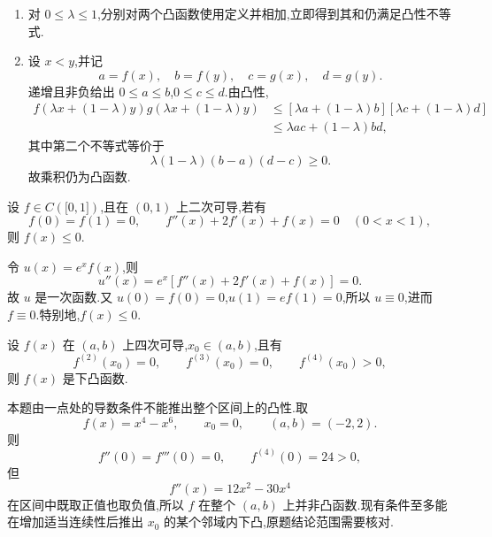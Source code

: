 \begin{solution}
    \leavevmode
    \begin{enumerate}
        \item 对 $0\leq\lambda\leq1$,分别对两个凸函数使用定义并相加,立即得到其和仍满足凸性不等式.

        \item 设 $x<y$,并记
              \[
                  a=f(x),\quad b=f(y),\quad c=g(x),\quad d=g(y).
              \]
              递增且非负给出 $0\leq a\leq b$,$0\leq c\leq d$.由凸性,
              \[
                  \begin{aligned}
                      f(\lambda x+(1-\lambda)y)
                      g(\lambda x+(1-\lambda)y)
                       & \leq[\lambda a+(1-\lambda)b]
                      [\lambda c+(1-\lambda)d]         \\
                       & \leq\lambda ac+(1-\lambda)bd,
                  \end{aligned}
              \]
              其中第二个不等式等价于
              \[
                  \lambda(1-\lambda)(b-a)(d-c)\geq0.
              \]
              故乘积仍为凸函数.
    \end{enumerate}
\end{solution}

\begin{example}
    设 $f\in C(\lbrack 0,1\rbrack)$,且在 $(0,1)$ 上二次可导,若有
    \[
        f(0)=f(1)=0,
        \qquad f''(x)+2f'(x)+f(x)=0\quad(0<x<1),
    \]
    则 $f(x)\leq0$.
\end{example}
\exampleblank

\begin{solution}
    令 $u(x)=e^x f(x)$,则
    \[
        u''(x)=e^x[f''(x)+2f'(x)+f(x)]=0.
    \]
    故 $u$ 是一次函数.又 $u(0)=f(0)=0$,$u(1)=ef(1)=0$,所以 $u\equiv0$,进而 $f\equiv0$.特别地,$f(x)\leq0$.
\end{solution}

\begin{example}
    设 $f(x)$ 在 $(a,b)$ 上四次可导,$x_0\in(a,b)$,且有
    \[
        f^{(2)}(x_0)=0,
        \qquad f^{(3)}(x_0)=0,
        \qquad f^{(4)}(x_0)>0,
    \]
    则 $f(x)$ 是下凸函数.
\end{example}
\exampleblank

\begin{solution}
    本题由一点处的导数条件不能推出整个区间上的凸性.取
    \[
        f(x)=x^4-x^6,
        \qquad x_0=0,
        \qquad (a,b)=(-2,2).
    \]
    则
    \[
        f''(0)=f'''(0)=0,
        \qquad f^{(4)}(0)=24>0,
    \]
    但
    \[
        f''(x)=12x^2-30x^4
    \]
    在区间中既取正值也取负值,所以 $f$ 在整个 $(a,b)$ 上并非凸函数.现有条件至多能在增加适当连续性后推出 $x_0$ 的某个邻域内下凸,原题结论范围需要核对.
\end{solution}

